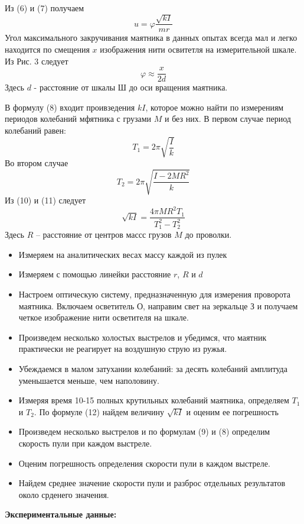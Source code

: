 \documentclass[a4paper,12pt]{article} %
\begin{document}
Из (6) и (7) получаем
\begin{equation}
u = \varphi\frac{\sqrt{kI}}{mr}
\end{equation}
Угол максимального закручивания маятника в данных опытах всегда мал и легко находится по смещения $x$ изображения нити освитетля на измерительной шкале. Из Рис. 3 следует
\begin{equation}
\varphi\approx\frac{x}{2d}
\end{equation}
Здесь $d$ - расстояние от шкалы Ш до оси вращения маятника.

В формулу (8) входит проивзедения $kI$, которое можно найти по измерениям периодов колебаний мфятника с грузами $M$ и без них. В первом случае период колебаний равен:
\begin{equation}
T_1 = 2\pi\sqrt{\frac{I}{k}}
\end{equation}
Во втором случае
\begin{equation}
T_2 = 2\pi\sqrt{\frac{I-2MR^2}{k}}
\end{equation}
Из (10) и (11) следует
\begin{equation}
\sqrt{kI}=\frac{4\pi MR^2T_1}{T_1^2-T_2^2}
\end{equation}
Здесь $R$ -- расстояние от центров массс грузов $M$ до проволки.
\begin{itemize}
\item Измеряем на аналитических весах массу каждой из пулек
\item Измеряем с помощью линейки расстояние $r$, $R$ и $d$
\item Настроем оптическую систему, предназначенную для измерения проворота маятника. Включаем осветитель О, направим свет на зеркальце З и получаем четкое изображение нити осветителя на шкале.
\item Произведем несколько холостых выстрелов и убедимся, что маятник практически не реагирует на воздушную струю из ружья.
\item Убеждаемся в малом затухании колебаний: за десять колебаний амплитуда уменьшается меньше, чем наполовину.
\item Измеряя время 10-15 полных крутильных колебаний маятника, определяем $T_1$ и $T_2$. По формуле (12) найдем величину $\sqrt{kI}$ и оценим ее погрешность
\item Произведем несколько выстрелов и по формулам (9) и (8) определим скорость пули при каждом выстреле.
\item Оценим погрешность определения скорости пули в каждом выстреле.
\item Найдем среднее значение скорости пули и разброс отдельных результатов около срденего значения.
\end{itemize}
\newpage
\textbf{Экспериментальные данные:}
\end{document}
